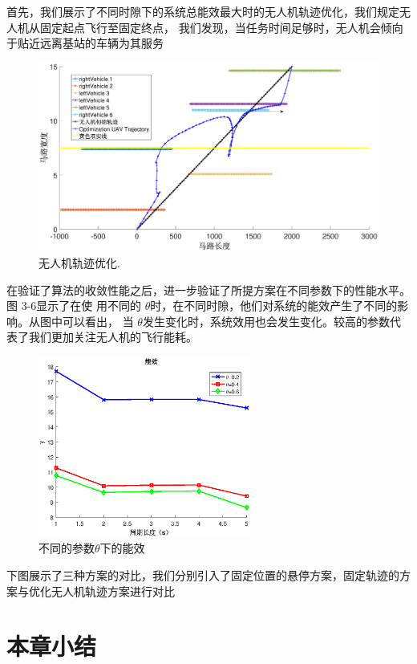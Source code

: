 首先，我们展示了不同时隙下的系统总能效最大时的无人机轨迹优化，我们规定无人机从固定起点飞行至固定终点，
我们发现，当任务时间足够时，无人机会倾向于贴近远离基站的车辆为其服务
\begin{figure}[H]
\centering
\includegraphics[width=16cm]{figures//chap4//大字体.eps}
\caption{无人机轨迹优化.}
\label{F67}
\end{figure}

在验证了算法的收敛性能之后，进一步验证了所提方案在不同参数下的性能水平。图 3-6显示了在使
用不同的 $\theta$时，在不同时隙，他们对系统的能效产生了不同的影响。从图中可以看出，
当 $\theta$发生变化时，系统效用也会发生变化。较高的参数代表了我们更加关注无人机的飞行能耗。
\begin{figure}[H]
\centering
\includegraphics[width=7cm]{figures//chap4//不同的参数theta下的能效.eps}
\caption{不同的参数$\theta$下的能效}
\label{不同的参数theta下的能效}
\end{figure}

下图展示了三种方案的对比，我们分别引入了固定位置的悬停方案，固定轨迹的方案与优化无人机轨迹方案进行对比
\section{本章小结}\label{section4-6}

